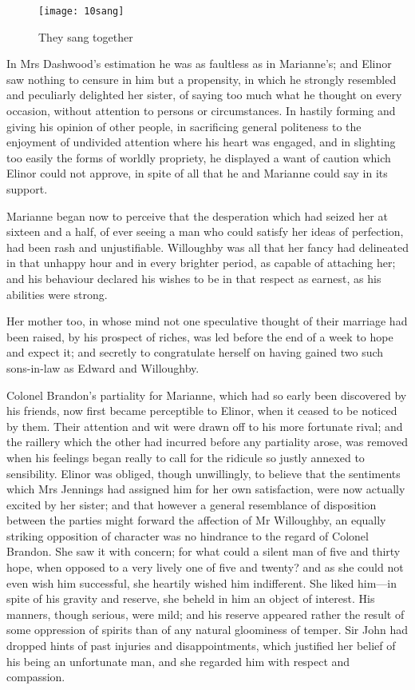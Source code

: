 \begin{figure}[tbph]
\centering
\texttt{[image: 10sang]}
\caption{They sang together}
\end{figure}

In Mrs Dashwood’s estimation he was as faultless as in Marianne’s; and Elinor saw nothing to censure in him but a propensity, in which he strongly resembled and peculiarly delighted her sister, of saying too much what he thought on every occasion, without attention to persons or circumstances. In hastily forming and giving his opinion of other people, in sacrificing general politeness to the enjoyment of undivided attention where his heart was engaged, and in slighting too easily the forms of worldly propriety, he displayed a want of caution which Elinor could not approve, in spite of all that he and Marianne could say in its support.

Marianne began now to perceive that the desperation which had seized her at sixteen and a half, of ever seeing a man who could satisfy her ideas of perfection, had been rash and unjustifiable. Willoughby was all that her fancy had delineated in that unhappy hour and in every brighter period, as capable of attaching her; and his behaviour declared his wishes to be in that respect as earnest, as his abilities were strong.

Her mother too, in whose mind not one speculative thought of their marriage had been raised, by his prospect of riches, was led before the end of a week to hope and expect it; and secretly to congratulate herself on having gained two such sons-in-law as Edward and Willoughby.

Colonel Brandon’s partiality for Marianne, which had so early been discovered by his friends, now first became perceptible to Elinor, when it ceased to be noticed by them. Their attention and wit were drawn off to his more fortunate rival; and the raillery which the other had incurred before any partiality arose, was removed when his feelings began really to call for the ridicule so justly annexed to sensibility. Elinor was obliged, though unwillingly, to believe that the sentiments which Mrs Jennings had assigned him for her own satisfaction, were now actually excited by her sister; and that however a general resemblance of disposition between the parties might forward the affection of Mr Willoughby, an equally striking opposition of character was no hindrance to the regard of Colonel Brandon. She saw it with concern; for what could a silent man of five and thirty hope, when opposed to a very lively one of five and twenty? and as she could not even wish him successful, she heartily wished him indifferent. She liked him—in spite of his gravity and reserve, she beheld in him an object of interest. His manners, though serious, were mild; and his reserve appeared rather the result of some oppression of spirits than of any natural gloominess of temper. Sir John had dropped hints of past injuries and disappointments, which justified her belief of his being an unfortunate man, and she regarded him with respect and compassion.

